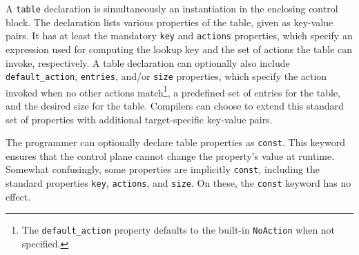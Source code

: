 A \texttt{table} declaration is simultaneously an instantiation in the enclosing
control block. The declaration lists various properties of the table, given as
key-value pairs. It has at least the mandatory \texttt{key} and \texttt{actions}
properties, which specify an expression used for computing the lookup key and
the set of actions the table can invoke, respectively. A table declaration can
optionally also include \texttt{default\_action}, \texttt{entries}, and/or
\texttt{size} properties, which specify the action invoked when no other actions
match\footnote{The \texttt{default\_action} property defaults to the built-in
\texttt{NoAction} when not specified.}, a predefined set of entries for the
table, and the desired size for the table. Compilers can choose to extend this
standard set of properties with additional target-specific key-value pairs.

The programmer can optionally declare table properties as \texttt{const}. This
keyword ensures that the control plane cannot change the property's value at
runtime. Somewhat confusingly, some properties are implicitly \texttt{const},
including the standard properties \texttt{key}, \texttt{actions}, and
\texttt{size}. On these, the \texttt{const} keyword has no effect.


